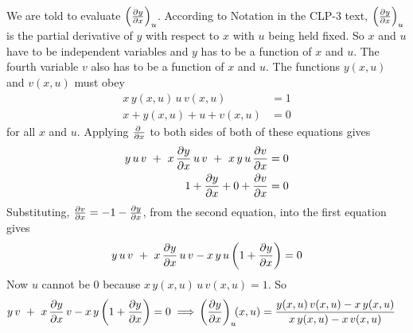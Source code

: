 \begin{solution}
We are told to evaluate $\left(\pdiff{y}{x}\right)_u$. According to Notation 
in the CLP-3 text, $\left(\pdiff{y}{x}\right)_u$ is the partial derivative of $y$ with respect to $x$ 
with $u$ being held fixed. So $x$ and $u$ have to be independent variables and $y$ has to be a function 
of $x$ and $u$. The fourth variable $v$ also has to be a function of $x$ and $u$. The functions 
$y(x,u)$ and $v(x,u)$ must obey 
\begin{align*}
x\,y(x,u)\,u\,v(x,u)&=1 \\
x+y(x,u)+u+v(x,u)&=0
\end{align*}
for all $x$ and $u$.
Applying 
$\pdiff{}{x}$ to both sides of both of these equations
gives
\begin{align*}
y\,u\,v\ +\ x\,\pdiff{y}{x}\,u\,v\ +\ x\,y\,u\,\pdiff{v}{x}&=0
\\
1+\pdiff{y}{x}+0+\pdiff{v}{x}&=0
\end{align*}
Substituting, $\pdiff{v}{x}=-1-\pdiff{y}{x}$,
from the second equation, into the first equation gives
\begin{align*}
y\,u\,v\ +\ x\,\pdiff{y}{x}\,u\,v-x\,y\,u
           \left(1+\pdiff{y}{x}\right)=0
\end{align*}
Now $u$ cannot be $0$ because $x\,y(x,u)\,u\,v(x,u)=1$. So
\begin{align*}
y\,v\ +\ x\,\pdiff{y}{x}\,v-x\,y\left(1+\pdiff{y}{x}\right)=0
\implies & \left(\pdiff{y}{x}\right)_u\!\!(x,u)
=\frac{y(x,u)\,v(x,u)-x\,y(x,u)}{x\,y(x,u)-x\,v(x,u)}
\end{align*}

\end{solution}
